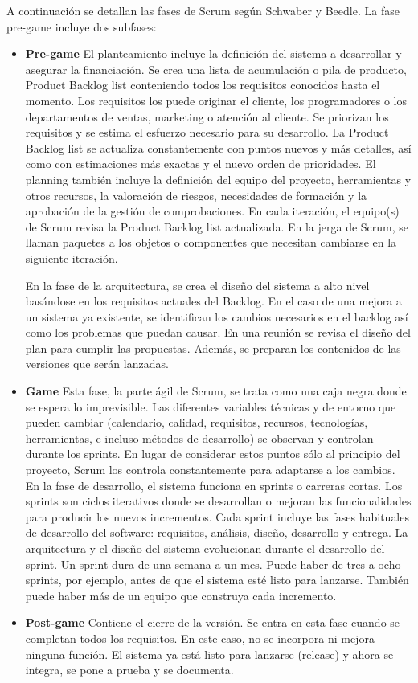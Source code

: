 A continuación se detallan las fases de Scrum según Schwaber y Beedle. La fase pre-game incluye dos subfases:
\begin{itemize}

\item \textbf{Pre-game}
El planteamiento incluye la definición del sistema a desarrollar y asegurar la financiación. Se crea una lista de acumulación o pila de producto, Product Backlog list conteniendo todos los requisitos conocidos hasta el momento. Los requisitos los puede originar el cliente, los programadores o los departamentos de ventas, marketing o atención al cliente. Se priorizan los requisitos y se estima el esfuerzo necesario para su desarrollo. La Product Backlog list se actualiza constantemente con puntos nuevos y más detalles, así como con estimaciones más exactas y el nuevo orden de prioridades. El planning también incluye la definición del equipo del proyecto, herramientas y otros recursos, la valoración de riesgos, necesidades de formación y la aprobación de la gestión de comprobaciones. En cada iteración, el equipo(s) de Scrum revisa la Product Backlog list actualizada. En la jerga de Scrum, se llaman paquetes a los objetos o componentes que necesitan cambiarse en la siguiente iteración.

En la fase de la arquitectura, se crea el diseño del sistema a alto nivel basándose en los requisitos actuales del Backlog. En el caso de una mejora a un sistema ya existente, se identifican los cambios necesarios en el backlog así como los problemas que puedan causar. En una reunión se revisa el diseño del plan para cumplir las propuestas. Además, se preparan los contenidos de las versiones que serán lanzadas. 

\item \textbf{Game}
Esta fase, la parte ágil de Scrum, se trata como una caja negra donde se espera lo imprevisible. Las diferentes variables técnicas y de entorno que pueden cambiar (calendario, calidad, requisitos, recursos, tecnologías, herramientas, e incluso métodos de desarrollo) se observan y controlan durante los sprints. En lugar de considerar estos puntos sólo al principio del proyecto, Scrum los controla constantemente para adaptarse a los cambios. En la fase de desarrollo, el sistema funciona en sprints o carreras cortas. Los sprints son ciclos iterativos donde se desarrollan o mejoran las funcionalidades para producir los nuevos incrementos. Cada sprint incluye las fases habituales de desarrollo del software: requisitos, análisis, diseño, desarrollo y entrega. La arquitectura y el diseño del sistema evolucionan durante el desarrollo del sprint. Un sprint dura de una semana a un mes. Puede haber de tres a ocho sprints, por ejemplo, antes de que el sistema esté listo para lanzarse. También puede haber más de un equipo que construya cada incremento.

\item \textbf{Post-game}
Contiene el cierre de la versión. Se entra en esta fase cuando se completan todos los requisitos. En este caso, no se incorpora ni mejora ninguna función. El sistema ya está listo para lanzarse (release) y ahora se integra, se pone a prueba y se documenta.
\end{itemize}

